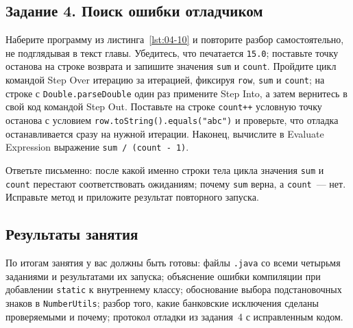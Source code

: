\subsection*{Задание 4. Поиск ошибки отладчиком}

Наберите программу из листинга~\ref{lst:04-10} и повторите разбор
самостоятельно, не подглядывая в текст главы. Убедитесь, что печатается
\texttt{15.0}; поставьте точку останова на строке возврата и запишите значения
\texttt{sum} и \texttt{count}. Пройдите цикл командой Step Over итерацию за
итерацией, фиксируя \texttt{row}, \texttt{sum} и \texttt{count}; на строке с
\texttt{Double.parseDouble} один раз примените Step Into, а затем вернитесь в
свой код командой Step Out. Поставьте на строке \texttt{count++}
условную точку останова с условием \texttt{row.toString().equals("abc")} и
проверьте, что отладка останавливается сразу на нужной итерации. Наконец,
вычислите в Evaluate Expression выражение \texttt{sum / (count - 1)}.

Ответьте письменно: после какой именно строки тела цикла значения \texttt{sum}
и \texttt{count} перестают соответствовать ожиданиям; почему \texttt{sum} верна,
а \texttt{count}~--- нет. Исправьте метод и приложите результат повторного
запуска.

\subsection*{Результаты занятия}

По итогам занятия у вас должны быть готовы: файлы \texttt{.java} со всеми
четырьмя заданиями и результатами их запуска; объяснение ошибки компиляции при
добавлении \texttt{static} к внутреннему классу; обоснование выбора
подстановочных знаков в \texttt{NumberUtils}; разбор того, какие банковские
исключения сделаны проверяемыми и почему; протокол отладки из задания~4 с
исправленным кодом.

\kontrolvoprosy

